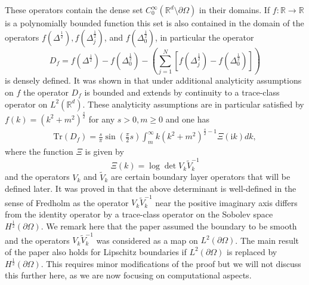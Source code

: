 These operators contain the dense set $C^\infty_0(\mathbb{R}^d \setminus \partial \Omega)$ in their domains.
If $f: \mathbb{R} \to \mathbb{R}$ is a polynomially bounded function this set is also contained in the domain of the operators
$f(\Delta^{\frac{1}{2}}), f(\Delta_{j}^{\frac{1}{2}})$, and $f(\Delta_{0}^{\frac{1}{2}})$, in particular the operator
$$
 D_{f} = f(\Delta^{\frac{1}{2}}) - f(\Delta_{0}^{\frac{1}{2}}) - \left(\sum_{j = 1}^{N}[f(\Delta_{j}^{\frac{1}{2}}) - f(\Delta_{0}^{\frac{1}{2}})]\right)
$$
is densely defined. It was shown in \cite{MR4484208} that under additional analyticity assumptions on $f$ the operator
$D_{f}$ is bounded and extends by continuity to a trace-class operator on $L^2(\mathbb{R}^{d})$. 
These analyticity assumptions are in particular satisfied by $f(k) = (k^{2}+ m^{2})^{\frac{s}{2}}$ for any $s > 0, m \geq 0$ and one has
\begin{align}\label{trace formula in terms of the boundary op}
    \text{Tr}\left( D_{f} \right)  = \frac{s}{\pi} \sin\left(\frac{\pi}{2} s\right) \int_{m}^{\infty} k (k^{2} + m^{2})^{\frac{s}{2}-1}\Xi(\mathrm{i} k) dk,
\end{align}
where the function $\Xi$ is given by
$$
 \Xi(k) = \log \det V_{k} \tilde V_{k}^{-1}
$$
and the operators $V_{k}$ and $\tilde V_{k}$ are certain boundary layer operators that will be defined later. 
It was proved in  \cite{MR4484208} that the above determinant is well-defined in the sense of Fredholm as the operator $V_{k} \tilde V_{k}^{-1}$ near the positive imaginary axis differs
from the identity operator by a trace-class operator on the Sobolev space $H^\frac{1}{2}(\partial \Omega)$.
We remark here that the paper \cite{MR4484208} assumed the boundary to be smooth and the operators $V_k  \tilde V_k^{-1}$ was considered as a 
map on $L^2(\partial \Omega)$. The main result of the paper also holds for Lipschitz boundaries if $L^2(\partial \Omega)$ is replaced by $H^\frac{1}{2}(\partial \Omega)$. This requires minor modifications of the proof but we will not discuss this further here, as we are now focusing on computational aspects.


